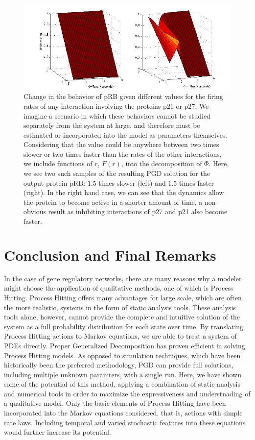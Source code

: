 \documentclass{article}
\begin{document}
\begin{figure}[h!]
\centering
 \includegraphics[width=\textwidth]{pRBresults.jpg}

 \caption{Change in the behavior of pRB given different values for the firing rates of any interaction involving the proteins p21 or p27. We imagine a scenario in which these behaviors cannot be studied separately from the system at large, and therefore must be estimated or incorporated into the model as parameters themselves. Considering that the value could be anywhere between two times slower or two times faster than the rates of the other interactions, we include functions of $r$, $F(r)$, into the decomposition of $\Phi$. Here, we see two such samples of the resulting PGD solution for the output protein pRB: $1.5$ times slower (left) and $1.5$ times faster (right). In the right hand case, we can see that the dynamics allow the protein to become active in a shorter amount of time, a non-obvious result as inhibiting interactions of p27 and p21 also become faster.}
  \label{compare_par}

\end{figure} 


\section{Conclusion and Final Remarks}
In the case of gene regulatory networks, there are many reasons why a modeler might choose the application of qualitative methods, one of which is Process Hitting. Process Hitting offers many advantages for large scale, which are often the more realistic, systems in the form of static analysis tools. These analysis tools alone, however, cannot provide the complete and intuitive solution of the system as a full probability distribution for each state over time. By translating Process Hitting actions to Markov equations, we are able to treat a system of PDEs directly. Proper Generalized Decomposition has proven efficient in solving Process Hitting models. As opposed to simulation techniques, which have been historically been the preferred methodology, PGD can provide full solutions, including multiple unknown paramters, with a single run. Here, we have shown some of the potential of this method, applying a combination of static analysis and numerical tools in order to maximize the expressiveness and understnading of a qualitative model. Only the basic elements of Process Hitting have been incorporated into the Markov equations considered, that is, actions with simple rate laws. Including temporal and varied stochastic features into these equations would further increase its potential.
\end{document}
